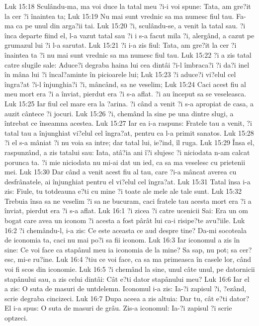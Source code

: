Luk 15:18  Sculându-ma, ma voi duce la tatal meu ?i-i voi spune: Tata, am gre?it la cer ?i înaintea ta;
Luk 15:19  Nu mai sunt vrednic sa ma numesc fiul tau. Fa-ma ca pe unul din arga?ii tai.
Luk 15:20  ?i, sculându-se, a venit la tatal sau. ?i înca departe fiind el, l-a vazut tatal sau ?i i s-a facut mila ?i, alergând, a cazut pe grumazul lui ?i l-a sarutat.
Luk 15:21  ?i i-a zis fiul: Tata, am gre?it la cer ?i înaintea ta ?i nu mai sunt vrednic sa ma numesc fiul tau.
Luk 15:22  ?i a zis tatal catre slugile sale: Aduce?i degraba haina lui cea dintâi ?i-l îmbraca?i ?i da?i inel în mâna lui ?i încal?aminte în picioarele lui;
Luk 15:23  ?i aduce?i vi?elul cel îngra?at ?i-l înjunghia?i ?i, mâncând, sa ne veselim;
Luk 15:24  Caci acest fiu al meu mort era ?i a înviat, pierdut era ?i s-a aflat. ?i au început sa se veseleasca.
Luk 15:25  Iar fiul cel mare era la ?arina. ?i când a venit ?i s-a apropiat de casa, a auzit cântece ?i jocuri.
Luk 15:26  ?i, chemând la sine pe una dintre slugi, a întrebat ce înseamna acestea.
Luk 15:27  Iar ea i-a raspuns: Fratele tau a venit, ?i tatal tau a înjunghiat vi?elul cel îngra?at, pentru ca l-a primit sanatos.
Luk 15:28  ?i el s-a mâniat ?i nu voia sa intre; dar tatal lui, ie?ind, îl ruga.
Luk 15:29  Însa el, raspunzând, a zis tatalui sau: Iata, atâ?ia ani î?i slujesc ?i niciodata n-am calcat porunca ta. ?i mie niciodata nu mi-ai dat un ied, ca sa ma veselesc cu prietenii mei.
Luk 15:30  Dar când a venit acest fiu al tau, care ?i-a mâncat averea cu desfrânatele, ai înjunghiat pentru el vi?elul cel îngra?at.
Luk 15:31  Tatal însa i-a zis: Fiule, tu totdeauna e?ti cu mine ?i toate ale mele ale tale sunt.
Luk 15:32  Trebuia însa sa ne veselim ?i sa ne bucuram, caci fratele tau acesta mort era ?i a înviat, pierdut era ?i s-a aflat.
Luk 16:1  ?i zicea ?i catre ucenicii Sai: Era un om bogat care avea un iconom ?i acesta a fost pârât lui ca-i risipe?te avu?iile.
Luk 16:2  ?i chemându-l, i-a zis: Ce este aceasta ce aud despre tine? Da-mi socoteala de iconomia ta, caci nu mai po?i sa fii iconom.
Luk 16:3  Iar iconomul a zis în sine: Ce voi face ca stapânul meu ia iconomia de la mine? Sa sap, nu pot; sa cer?esc, mi-e ru?ine.
Luk 16:4  ?tiu ce voi face, ca sa ma primeasca în casele lor, când voi fi scos din iconomie.
Luk 16:5  ?i chemând la sine, unul câte unul, pe datornicii stapânului sau, a zis celui dintâi: Cât e?ti dator stapânului meu?
Luk 16:6  Iar el a zis: O suta de masuri de untdelemn. Iconomul i-a zis: Ia-?i zapisul ?i, ?ezând, scrie degraba cincizeci.
Luk 16:7  Dupa aceea a zis altuia: Dar tu, cât e?ti dator? El i-a spus: O suta de masuri de grâu. Zis-a iconomul: Ia-?i zapisul ?i scrie optzeci.
